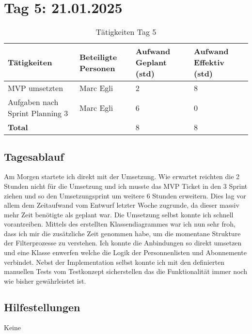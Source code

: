 \section{Tag 5: 21.01.2025}
\begin{table}[H]
    \begin{tabular}{|L{0.4\textwidth}|C{60pt}|C{60pt}|C{60pt}|}
        \hline
        \color{white}Tätigkeiten & \color{white}Beteiligte \color{white}Personen & \color{white}Aufwand Geplant (std) & \color{white}Aufwand Effektiv (std) \\
        \hline
        MVP umsetzten & Marc Egli & 2 & 8 \\
        \hline
        Aufgaben nach Sprint Planning 3 & Marc Egli & 6 & 0 \\
        \textbf{Total} & & 8 & 8 \\
        \hline
    \end{tabular}
    \caption{Tätigkeiten Tag 5}
\end{table}

\subsection*{Tagesablauf}
Am Morgen startete ich direkt mit der Umsetzung. Wie erwartet reichten die 2 Stunden nicht für die Umsetzung und ich musste das 
MVP Ticket in den 3 Sprint ziehen und so den Umsetzungsprint um weitere 6 Stunden erweitern. Dies lag vor allem dem Zeitaufwand
vom Entwurf letzter Woche zugrunde, da dieser massiv mehr Zeit benötigte als geplant war. Die Umsetzung selbst konnte ich schnell vorantreiben.
Mittels des erstellten Klassendiagrammes war ich nun sehr froh, dass ich mir die zusätzliche Zeit genommen habe, um die momentane Strukture der Filterprozesse
zu verstehen. Ich konnte die Anbindungen so direkt umsetzen und eine Klasse enwerfen welche
die Logik der Personnenlisten und Abonnemente verbindet. Nebst der Implementation selbst konnte ich mit den definierten manuellen Tests vom Testkonzept
sicherstellen das die Funktionalität immer noch wie bisher gewährleistet ist. 

\subsection*{Hilfestellungen}
Keine

